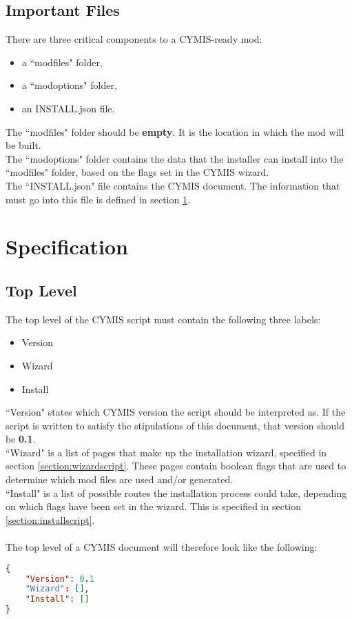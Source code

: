 \documentclass{article}
\newcommand{\cymisversion}{0.1}
\begin{document}
\subsection{Important Files}
There are three critical components to a CYMIS-ready mod:
\begin{itemize}
\item a ``modfiles" folder,
\item a ``modoptions" folder,
\item an INSTALL.json file.
\end{itemize}
The ``modfiles" folder should be \textbf{empty}. It is the location in which the mod will be built.\\
The ``modoptions" folder contains the data that the installer can install into the ``modfiles" folder, based on the flags set in the CYMIS wizard.\\
The ``INSTALL.json" file contains the CYMIS document. The information that must go into this file is defined in section \ref{section:specification}.
\newpage

\section{Specification}\label{section:specification}
\subsection{Top Level}
The top level of the CYMIS script must contain the following three labels:
\begin{itemize}
\item Version
\item Wizard
\item Install
\end{itemize}
``Version" states which CYMIS version the script should be interpreted as. If the script is written to satisfy the stipulations of this document, that version should be \textbf{\cymisversion}.\\
``Wizard" is a list of pages that make up the installation wizard, specified in section \ref{section:wizardscript}. These pages contain boolean flags that are used to determine which mod files are used and/or generated.\\
``Install" is a list of possible routes the installation process could take, depending on which flags have been set in the wizard. This is specified in section \ref{section:installscript}.\\\\
The top level of a CYMIS document will therefore look like the following:
\begin{lstlisting}[language=json,firstnumber=1]
{
    "Version": 0.1
    "Wizard": [],
    "Install": []
}
\end{lstlisting}
\newpage
\end{document}
